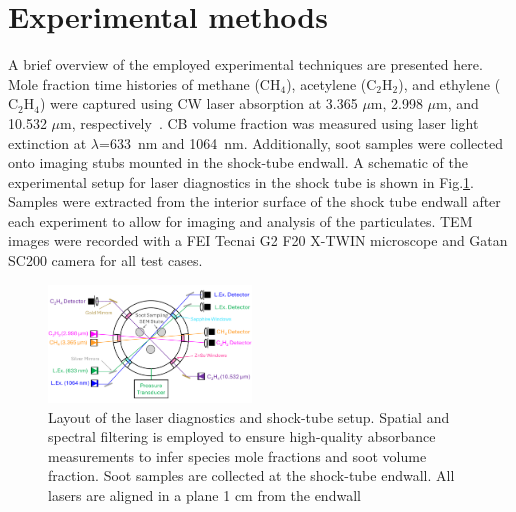 \section{Experimental methods}
A brief overview of the employed experimental techniques are presented here. Mole fraction time histories of methane ($\mathrm{CH_4}$), acetylene ($\mathrm{C_2H_2}$), and ethylene ($\mathrm{C_2H_4}$) were captured using CW laser absorption at 3.365 $\mu$m, 2.998 $\mu$m, and 10.532 $\mu$m, respectively~\citep{stranic2014laser,pinkowski2019multi, cassady2020thermal}. CB volume fraction was measured using laser light extinction at $\lambda$=633~nm and 1064~nm.%
Additionally, soot samples were collected onto imaging stubs mounted in the shock-tube endwall. A schematic of the experimental setup for laser diagnostics in the shock tube is shown in Fig.\ref{fig:laserlayout}. Samples were extracted from the interior surface of the shock tube endwall after each experiment to allow for imaging and analysis of the particulates. TEM images were recorded with a FEI Tecnai G2 F20 X-TWIN microscope and Gatan SC200 camera for all test cases.


\begin{figure}[!t]
	\centering
	\includegraphics[width=0.48\textwidth]{Figures/laser_setup.pdf}
	\caption{Layout of the laser diagnostics and shock-tube setup. Spatial and spectral filtering is employed to ensure high-quality absorbance measurements to infer species mole fractions and soot volume fraction. Soot samples are collected at the shock-tube endwall. All lasers are aligned in a plane 1 cm from the endwall}
	\label{fig:laserlayout} 
\end{figure}